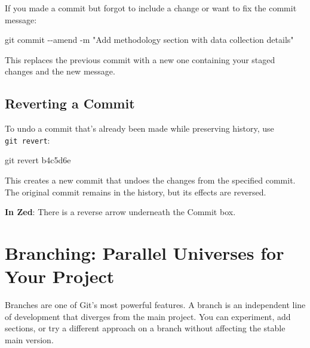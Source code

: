 \documentclass[
  letterpaper,
  DIV=11,
  numbers=noendperiod]{scrreprt}
\newenvironment{Shaded}{\begin{snugshade}}{\end{snugshade}}
\newcommand{\AttributeTok}[1]{\textcolor[rgb]{0.40,0.45,0.13}{#1}}
\newcommand{\FunctionTok}[1]{\textcolor[rgb]{0.28,0.35,0.67}{#1}}
\newcommand{\NormalTok}[1]{\textcolor[rgb]{0.00,0.23,0.31}{#1}}
\newcommand{\StringTok}[1]{\textcolor[rgb]{0.13,0.47,0.30}{#1}}
\begin{document}
If you made a commit but forgot to include a change or want to fix the
commit message:

\begin{codelisting}

\caption{\texttt{terminal}}

\begin{Shaded}
\begin{Highlighting}[]
\FunctionTok{git}\NormalTok{ commit }\AttributeTok{{-}{-}amend} \AttributeTok{{-}m} \StringTok{"Add methodology section with data collection details"}
\end{Highlighting}
\end{Shaded}

\end{codelisting}

This replaces the previous commit with a new one containing your staged
changes and the new message.

\subsection{Reverting a Commit}\label{reverting-a-commit}

To undo a commit that's already been made while preserving history, use
\texttt{git\ revert}:

\begin{codelisting}

\caption{\texttt{terminal}}

\begin{Shaded}
\begin{Highlighting}[]
\FunctionTok{git}\NormalTok{ revert b4c5d6e}
\end{Highlighting}
\end{Shaded}

\end{codelisting}

This creates a new commit that undoes the changes from the specified
commit. The original commit remains in the history, but its effects are
reversed.

\textbf{In Zed}: There is a reverse arrow underneath the Commit box.

\section{Branching: Parallel Universes for Your
Project}\label{branching-parallel-universes-for-your-project}

Branches are one of Git's most powerful features. A branch is an
independent line of development that diverges from the main project. You
can experiment, add sections, or try a different approach on a branch
without affecting the stable main version.
\end{document}
